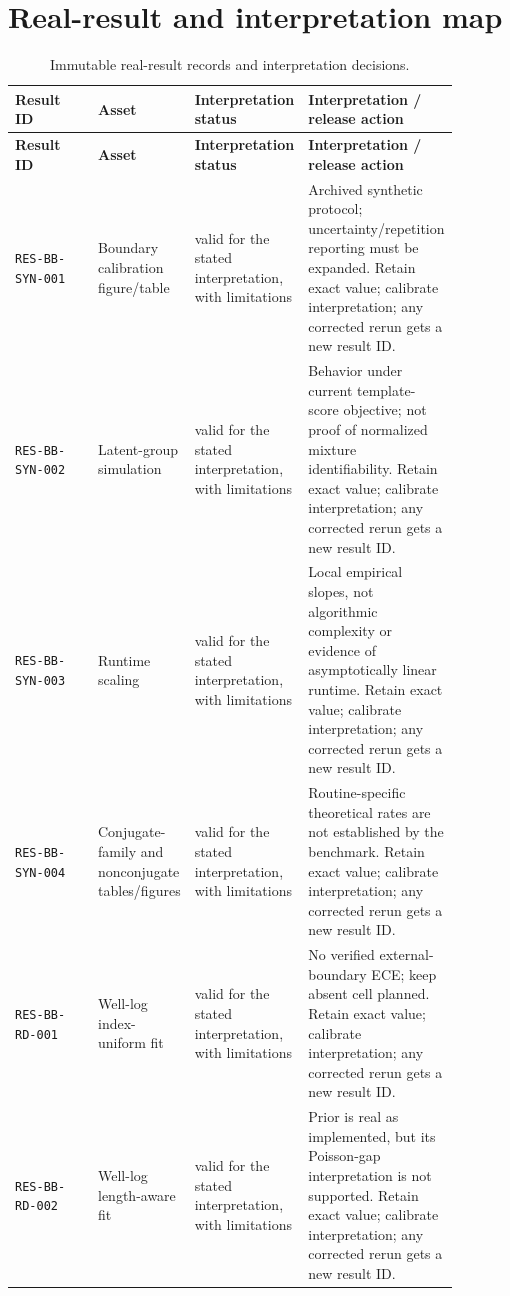 \section{Real-result and interpretation map}
\small
\begin{longtable}{@{}p{0.19\linewidth}p{0.21\linewidth}p{0.17\linewidth}p{0.31\linewidth}@{}}
\caption{Immutable real-result records and interpretation decisions.}\label{tab:result-admissibility}\\
\toprule
\textbf{Result ID} & \textbf{Asset} & \textbf{Interpretation status} & \textbf{Interpretation / release action}\\
\midrule
\endfirsthead
\toprule
\textbf{Result ID} & \textbf{Asset} & \textbf{Interpretation status} & \textbf{Interpretation / release action}\\
\midrule
\endhead
\texttt{RES-BB-SYN-001} & Boundary calibration figure/table & valid for the stated interpretation, with limitations & Archived synthetic protocol; uncertainty/repetition reporting must be expanded. Retain exact value; calibrate interpretation; any corrected rerun gets a new result ID. \\
\texttt{RES-BB-SYN-002} & Latent-group simulation & valid for the stated interpretation, with limitations & Behavior under current template-score objective; not proof of normalized mixture identifiability. Retain exact value; calibrate interpretation; any corrected rerun gets a new result ID. \\
\texttt{RES-BB-SYN-003} & Runtime scaling & valid for the stated interpretation, with limitations & Local empirical slopes, not algorithmic complexity or evidence of asymptotically linear runtime. Retain exact value; calibrate interpretation; any corrected rerun gets a new result ID. \\
\texttt{RES-BB-SYN-004} & Conjugate-family and nonconjugate tables/figures & valid for the stated interpretation, with limitations & Routine-specific theoretical rates are not established by the benchmark. Retain exact value; calibrate interpretation; any corrected rerun gets a new result ID. \\
\texttt{RES-BB-RD-001} & Well-log index-uniform fit & valid for the stated interpretation, with limitations & No verified external-boundary ECE; keep absent cell planned. Retain exact value; calibrate interpretation; any corrected rerun gets a new result ID. \\
\texttt{RES-BB-RD-002} & Well-log length-aware fit & valid for the stated interpretation, with limitations & Prior is real as implemented, but its Poisson-gap interpretation is not supported. Retain exact value; calibrate interpretation; any corrected rerun gets a new result ID. \\

\end{longtable}
